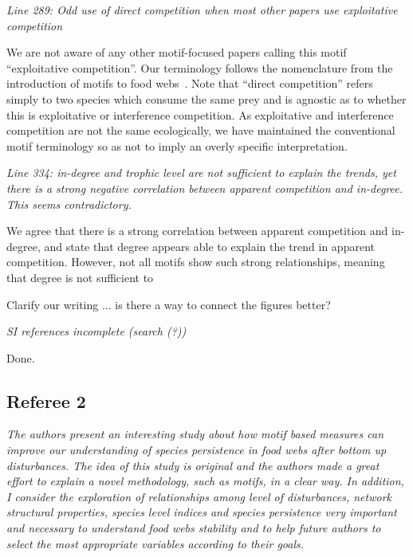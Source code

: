 \documentclass[12pt]{article}
\newcommand{\us}{\rm \setlength{\leftskip}{0.3cm} \setlength{\rightskip}{0.3cm}}
\newcommand{\them}{\it \setlength{\leftskip}{0cm} \setlength{\rightskip}{0cm}}
\begin{document}
        \them
        Line 289: Odd use of direct competition when most other papers use exploitative competition
        
        \us We are not aware of any other motif-focused papers calling this motif ``exploitative competition''. Our terminology follows the nomenclature from the introduction of motifs to food webs~\citep{Stouffer2007}.
        Note that ``direct competition'' refers simply to two species which consume the same prey and is agnostic as to whether this is exploitative or interference competition. 
        As exploitative and interference competition are not the same ecologically, we have maintained the conventional motif terminology so as not to imply an overly specific interpretation.
        
        
        \them
        Line 334: in-degree and trophic level are not sufficient to explain the trends, yet there is a strong negative correlation between apparent competition and in-degree. This seems contradictory.
        
        \us We agree that there is a strong correlation between apparent competition and in-degree, and state that degree appears able to explain the trend in apparent competition. However, not all motifs show such strong relationships, meaning that degree is not sufficient to 
        
        Clarify our writing ... is there a way to connect the figures better?
        
        \them
        SI references incomplete (search (?))
        
        \us
        Done.




\subsection*{Referee 2}

    \them
    The authors present an interesting study about how motif based measures can improve our understanding of species persistence in food webs after bottom up disturbances. The idea of this study is original and the authors made a great effort to explain a novel methodology, such as motifs, in a clear way. In addition, I consider the exploration of relationships among level of disturbances, network structural properties, species level indices and species persistence very important and necessary to understand food webs stability and to help future authors to select the most appropriate variables according to their goals.
\end{document}
